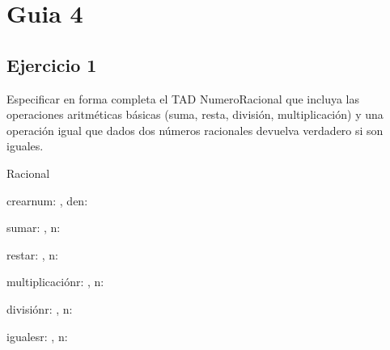 





\maketitle
\newpage

\tableofcontents
\newpage

\section{Guia 4}

\subsection{Ejercicio 1}
Especificar en forma completa el TAD NumeroRacional que incluya las operaciones aritméticas básicas (suma, resta, división, multiplicación) y una operación igual que dados dos números racionales devuelva verdadero si son iguales.

\begin{tad}{Racional}{}
	\begin{proc}{crear}{\In num: \ent, \In den: \ent}{\tadtype}
	\end{proc}

	\begin{proc}{suma}{\Inout r: \tadtype, n: \tadtype}{}
	\end{proc}

	\begin{proc}{resta}{\Inout r: \tadtype, n: \tadtype}{}
	\end{proc}

	\begin{proc}{multiplicación}{\Inout r: \tadtype, n: \tadtype}{}
	\end{proc}

	\begin{proc}{división}{\Inout r: \tadtype, n: \tadtype}{}
	\end{proc}

	\begin{proc}{iguales}{\In r: \tadtype, n: \tadtype}{\bool}
	\end{proc}
\end{tad}

